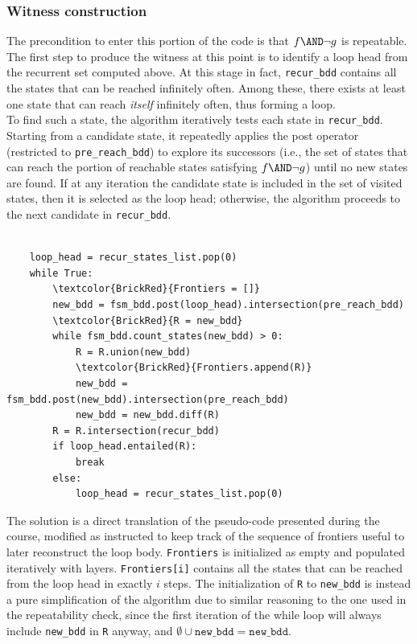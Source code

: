 \subsubsection*{Witness construction}
The precondition to enter this portion of the code is that \(f \AND \neg g\) is repeatable. The first step to produce the witness at this point is to identify a loop head from the recurrent set computed above. At this stage in fact, \texttt{recur\_bdd} contains all the states that can be reached infinitely often. Among these, there exists at least one state that can reach \textit{itself} infinitely often, thus forming a loop.\\[2ex]
To find such a state, the algorithm iteratively tests each state in \texttt{recur\_bdd}. Starting from a candidate state, it repeatedly applies the post operator (restricted to \texttt{pre\_reach\_bdd}) to explore its successors (i.e., the set of states that can reach the portion of reachable states satisfying \(f \AND \neg g\)) until no new states are found. If at any iteration the candidate state is included in the set of visited states, then it is selected as the loop head; otherwise, the algorithm proceeds to the next candidate in \texttt{recur\_bdd}.
\begin{scriptsize}
\begin{Verbatim}[commandchars=\\\{\}]

    loop_head = recur_states_list.pop(0)
    while True:
        \textcolor{BrickRed}{Frontiers = []}
        new_bdd = fsm_bdd.post(loop_head).intersection(pre_reach_bdd)
        \textcolor{BrickRed}{R = new_bdd}
        while fsm_bdd.count_states(new_bdd) > 0:
            R = R.union(new_bdd)
            \textcolor{BrickRed}{Frontiers.append(R)}
            new_bdd = fsm_bdd.post(new_bdd).intersection(pre_reach_bdd)
            new_bdd = new_bdd.diff(R)
        R = R.intersection(recur_bdd)
        if loop_head.entailed(R):
            break
        else:
            loop_head = recur_states_list.pop(0)

\end{Verbatim}
\end{scriptsize}
The solution is a direct translation of the pseudo-code presented during the course, modified as instructed to keep track of the sequence of frontiers useful to later reconstruct the loop body. \texttt{Frontiers} is initialized as empty and populated iteratively with layers. \texttt{Frontiers[i]} contains all the states that can be reached from the loop head in exactly \(i\) steps. The initialization of \texttt{R} to \texttt{new\_bdd} is instead a pure simplification of the algorithm due to similar reasoning to the one used in the repeatability check, since the first iteration of the while loop will always include \texttt{new\_bdd} in \texttt{R} anyway, and \(\emptyset \cup \texttt{new\_bdd} = \texttt{new\_bdd}\).\\[2ex]
